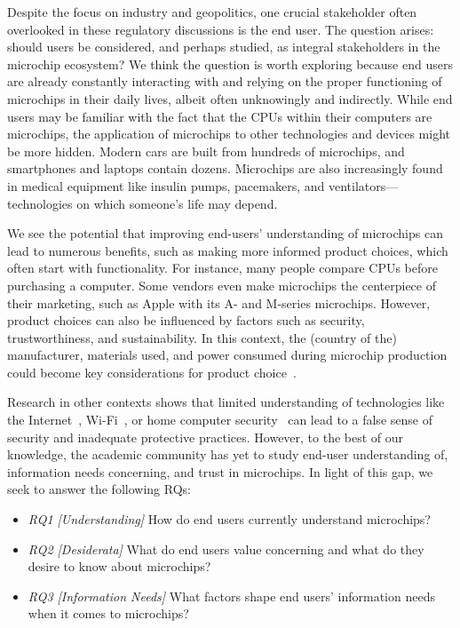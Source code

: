 Despite the focus on industry and geopolitics, one crucial stakeholder often overlooked in these regulatory discussions is the end user. 
The question arises: should users be considered, and perhaps studied, as integral stakeholders in the microchip ecosystem? 
We think the question is worth exploring because end users are already constantly interacting with and relying on the proper functioning of microchips in their daily lives, albeit often unknowingly and indirectly. 
While end users may be familiar with the fact that the \acsp{CPU} within their computers are microchips, the application of microchips to other technologies and devices might be more hidden. 
Modern cars are built from hundreds of microchips, and smartphones and laptops contain dozens.
Microchips are also increasingly found in medical equipment like insulin pumps, pacemakers, and ventilators---technologies on which someone's life may depend.

We see the potential that improving end-users' understanding of microchips can lead to numerous benefits, such as making more informed product choices, which often start with functionality.
For instance, many people compare CPUs before purchasing a computer.
Some vendors even make microchips the centerpiece of their marketing, such as Apple with its A- and M-series microchips.
However, product choices can also be influenced by factors such as security, trustworthiness, and sustainability.
In this context, the (country of the) manufacturer, materials used, and power consumed during microchip production~\cite{DBLP:conf/hpca/GuptaKLTLW0W21,WILLIAMS20042,VILLARD201598} could become key considerations for product choice~\cite{LIN201211}.

Research in other contexts shows that limited understanding of technologies like the Internet~\cite{kang2015my}, Wi-Fi~\cite{klasnja2009wi}, or home computer security~\cite{wash2010folk} can lead to a false sense of security and inadequate protective practices. 
However, to the best of our knowledge, the academic community has yet to study end-user understanding of, information needs concerning, and trust in microchips.
In light of this gap, we seek to answer the following \acp{RQ}:
\begin{itemize}
    \item \textit{RQ1 [Understanding]} 
    How do end users currently understand microchips?
    \item \textit{RQ2 [Desiderata]} 
    What do end users value concerning and what do they desire to know about microchips?
    \item \textit{RQ3 [Information Needs]}  
    What factors shape end users' information needs when it comes to microchips?
\end{itemize}

